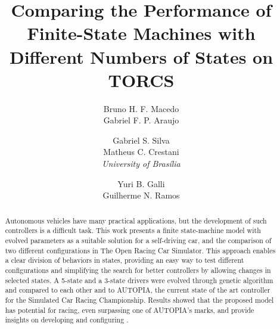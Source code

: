 \documentclass[a4paper]{sbgames}
\title{Comparing the Performance of Finite-State Machines with Different Numbers of States on TORCS}
\author{Bruno H. F. Macedo\\Gabriel F. P. Araujo\\
		\and Gabriel S. Silva\\Matheus C. Crestani\\\textit{University of Bras\'{i}lia}
		\and Yuri B. Galli\\ Guilherme N. Ramos\\
}
\begin{document}
	\maketitle

	\begin{abstract}
		Autonomous vehicles have many practical applications, but the development of such controllers is a difficult task. This work presents a finite state-machine model with evolved parameters as a suitable solution for a self-driving car, and the comparison of two different configurations in The Open Racing Car Simulator. This approach enables a clear division of behaviors in states, providing an easy way to test different configurations and simplifying the search for better controllers by allowing changes in selected states. A 5-state and a 3-state drivers were evolved through genetic algorithm and compared to each other and to AUTOPIA, the current state of the art controller for the Simulated Car Racing Championship. Results showed that the proposed model has potential for racing, even surpassing one of AUTOPIA's marks, and provide insights on developing and configuring .
	\end{abstract}

	\keywordlist
	\contactlist

	


	
	
\end{document}
